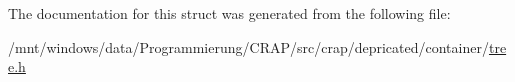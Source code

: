 The documentation for this struct was generated from the following file\-:\begin{DoxyCompactItemize}
\item 
/mnt/windows/data/\-Programmierung/\-C\-R\-A\-P/src/crap/depricated/container/\hyperlink{tree_8h}{tree.\-h}\end{DoxyCompactItemize}
